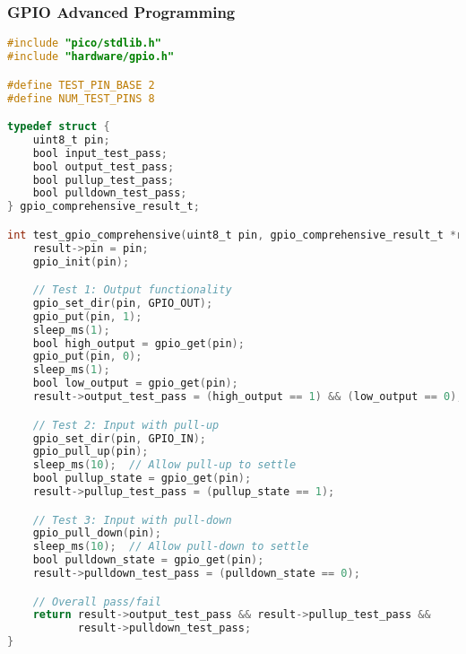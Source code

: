 \documentclass{beamer}
\begin{document}
\begin{frame}[fragile]
\frametitle{GPIO Advanced Programming}
\begin{lstlisting}[language=C]
#include "pico/stdlib.h"
#include "hardware/gpio.h"

#define TEST_PIN_BASE 2
#define NUM_TEST_PINS 8

typedef struct {
    uint8_t pin;
    bool input_test_pass;
    bool output_test_pass;
    bool pullup_test_pass;
    bool pulldown_test_pass;
} gpio_comprehensive_result_t;

int test_gpio_comprehensive(uint8_t pin, gpio_comprehensive_result_t *result) {
    result->pin = pin;
    gpio_init(pin);

    // Test 1: Output functionality
    gpio_set_dir(pin, GPIO_OUT);
    gpio_put(pin, 1);
    sleep_ms(1);
    bool high_output = gpio_get(pin);
    gpio_put(pin, 0);
    sleep_ms(1);
    bool low_output = gpio_get(pin);
    result->output_test_pass = (high_output == 1) && (low_output == 0);

    // Test 2: Input with pull-up
    gpio_set_dir(pin, GPIO_IN);
    gpio_pull_up(pin);
    sleep_ms(10);  // Allow pull-up to settle
    bool pullup_state = gpio_get(pin);
    result->pullup_test_pass = (pullup_state == 1);

    // Test 3: Input with pull-down
    gpio_pull_down(pin);
    sleep_ms(10);  // Allow pull-down to settle
    bool pulldown_state = gpio_get(pin);
    result->pulldown_test_pass = (pulldown_state == 0);

    // Overall pass/fail
    return result->output_test_pass && result->pullup_test_pass &&
           result->pulldown_test_pass;
}
\end{lstlisting}
\end{frame}
\end{document}
